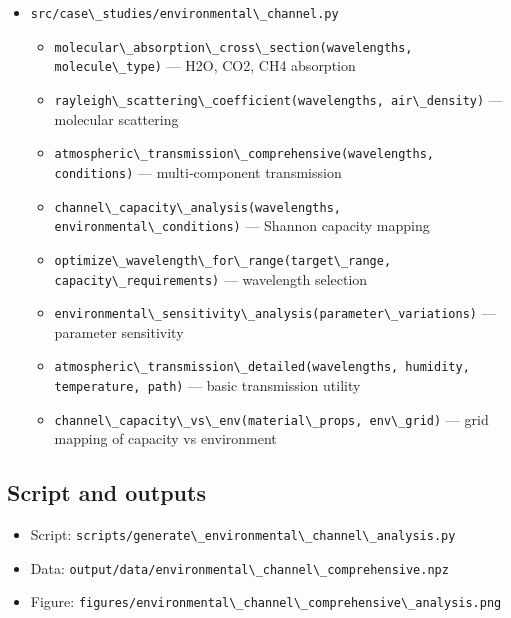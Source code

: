 \documentclass[
  13pt,
  a4paperpaper,
  12pt]{article}
\newcommand{\passthrough}[1]{#1}
\providecommand{\tightlist}{%
  \setlength{\itemsep}{0pt}\setlength{\parskip}{0pt}}
\begin{document}
\begin{itemize}
\tightlist
\item
  \passthrough{\lstinline!src/case\_studies/environmental\_channel.py!}

  \begin{itemize}
  \tightlist
  \item
    \passthrough{\lstinline!molecular\_absorption\_cross\_section(wavelengths, molecule\_type)!}
    --- H2O, CO2, CH4 absorption
  \item
    \passthrough{\lstinline!rayleigh\_scattering\_coefficient(wavelengths, air\_density)!}
    --- molecular scattering
  \item
    \passthrough{\lstinline!atmospheric\_transmission\_comprehensive(wavelengths, conditions)!}
    --- multi‑component transmission
  \item
    \passthrough{\lstinline!channel\_capacity\_analysis(wavelengths, environmental\_conditions)!}
    --- Shannon capacity mapping
  \item
    \passthrough{\lstinline!optimize\_wavelength\_for\_range(target\_range, capacity\_requirements)!}
    --- wavelength selection
  \item
    \passthrough{\lstinline!environmental\_sensitivity\_analysis(parameter\_variations)!}
    --- parameter sensitivity
  \item
    \passthrough{\lstinline!atmospheric\_transmission\_detailed(wavelengths, humidity, temperature, path)!}
    --- basic transmission utility
  \item
    \passthrough{\lstinline!channel\_capacity\_vs\_env(material\_props, env\_grid)!}
    --- grid mapping of capacity vs environment
  \end{itemize}
\end{itemize}

\subsection{Script and outputs}\label{script-and-outputs-1}

\begin{itemize}
\tightlist
\item
  Script:
  \passthrough{\lstinline!scripts/generate\_environmental\_channel\_analysis.py!}
\item
  Data:
  \passthrough{\lstinline!output/data/environmental\_channel\_comprehensive.npz!}
\item
  Figure:
  \passthrough{\lstinline!figures/environmental\_channel\_comprehensive\_analysis.png!}
\end{itemize}
\end{document}
